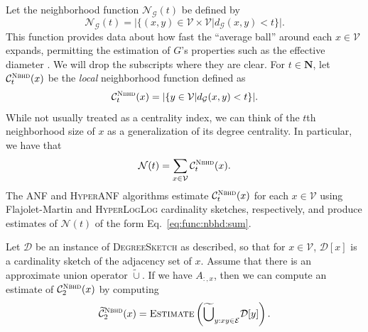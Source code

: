 \documentclass[10]{article}
\newcommand{\algoname}[1]{\textnormal{\textsc{#1}}}
\begin{document}
Let the neighborhood function $\mathcal{N}_\mathcal{G}(t)$ be defined by 
%
\begin{equation} \label{eq:func:nbhd}
	\mathcal{N}_\mathcal{G}(t) = |\{(x, y) \in \mathcal{V} \times \mathcal{V} | d_\mathcal{G}(x, y) < t\}|.
\end{equation}
%
This function provides data about how fast the ``average ball'' around each $x \in \mathcal{V}$ expands, permitting the estimation of $G$'s properties such as the effective diameter \cite{palmer2002anf}.
We will drop the subscripts where they are clear.
For $t \in \mathbf{N}$, let $\mathcal{C}^{\algoname{Nbhd}}_t(x)$ be the \emph{local} neighborhood function defined as 
%
\begin{equation} \label{eq:func:nbhd:local}
	\mathcal{C}^{\algoname{Nbhd}}_t(x) = |\{y \in \mathcal{V} | d_\mathcal{G}(x, y) < t\}|.
\end{equation}
%
While not usually treated as a centrality index, we can think of the $t$th neighborhood size of $x$ as a generalization of its degree centrality.
In particular, we have that 
%
\begin{equation} \label{eq:func:nbhd:sum}
	\mathcal{N}(t) = \sum_{x \in \mathcal{V}} \mathcal{C}^{\algoname{Nbhd}}_t(x).
\end{equation}
%
The \algoname{ANF} \cite{palmer2002anf} and \algoname{HyperANF} \cite{boldi2011hyperanf} algorithms estimate 
$\mathcal{C}^{\algoname{Nbhd}}_t(x)$ 
for each $x \in \mathcal{V}$ using Flajolet-Martin and \algoname{HyperLogLog} cardinality sketches, respectively, and produce estimates of $\mathcal{N}(t)$ of the form Eq.~\eqref{eq:func:nbhd:sum}.

Let $\mathcal{D}$ be an instance of \algoname{DegreeSketch} as described, so that for $x \in \mathcal{V}$, $\mathcal{D}[x]$ is a cardinality sketch of the adjacency set of $x$.
Assume that there is an approximate union operator $\widetilde{\cup}$.
If we have $A_{:,x}$, then we can compute an estimate of $\mathcal{C}^{\algoname{Nbhd}}_2(x)$ by computing 
%
\begin{equation} \label{eq:estimate:nbhd}
	\widetilde{\mathcal{C}}^{\algoname{Nbhd}}_2(x) 
	= \algoname{Estimate} \left ( \widetilde{\bigcup}_{y: xy \in \mathcal{E}} \mathcal{D}[y] \right ).
\end{equation}
%
\end{document}
